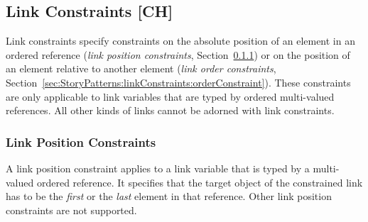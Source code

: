 {
\subsection{Link Constraints [CH]}
\label{sec:StoryPatterns:linkConstraints}

Link constraints specify constraints on the absolute position of an element in an ordered reference (\emph{link position constraints}, Section~\ref{sec:StoryPatterns:linkConstraints:posConstraint}) or on the position of an element relative to another element (\emph{link order constraints}, Section~\ref{sec:StoryPatterns:linkConstraints:orderConstraint}). These constraints are only applicable to link variables that are typed by ordered multi-valued references. All other kinds of links cannot be adorned with link constraints.



\subsubsection{Link Position Constraints}
\label{sec:StoryPatterns:linkConstraints:posConstraint}

A link position constraint applies to a link variable that is typed by a multi-valued ordered reference. It specifies that the target object of the constrained link has to be the \emph{first} or the \emph{last} element in that reference. Other link position constraints are not supported.


}
